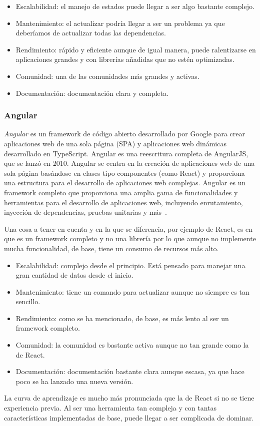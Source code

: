 \begin{itemize}
    \item[\bien] Escalabilidad: el manejo de estados puede llegar a ser algo bastante complejo.
    \item[\regular] Mantenimiento: el actualizar podría llegar a ser un problema ya que deberíamos de actualizar todas las dependencias.
    \item[\regular] Rendimiento: rápido y eficiente aunque de igual manera, puede ralentizarse en aplicaciones grandes y con librerías añadidas que no estén optimizadas.
    \item[\esp] Comunidad: una de las comunidades más grandes y activas.
    \item[\bien] Documentación: documentación clara y completa.
\end{itemize}

\subsubsection{Angular}

\textit{Angular} es un framework de código abierto desarrollado por Google para crear aplicaciones web de una sola página (SPA) y aplicaciones web dinámicas desarrollado en TypeScript. Angular es una reescritura completa de AngularJS, que se lanzó en 2010. Angular se centra en la creación de aplicaciones web de una sola página basándose en clases tipo componentes (como React) y proporciona una estructura para el desarrollo de aplicaciones web complejas. Angular es un framework completo que proporciona una amplia gama de funcionalidades y herramientas para el desarrollo de aplicaciones web, incluyendo enrutamiento, inyección de dependencias, pruebas unitarias y más~\cite{angular-wikipedia}.

Una cosa a tener en cuenta y en la que se diferencia, por ejemplo de React, es en que es un framework completo y no una librería por lo que aunque no implemente mucha funcionalidad, de base, tiene un consumo de recursos más alto.

\begin{itemize}
    \item[\regular] Escalabilidad: complejo desde el principio. Está pensado para manejar una gran cantidad de datos desde el inicio.
    \item[\bien] Mantenimiento: tiene un comando para actualizar aunque no siempre es tan sencillo.
    \item[\regular] Rendimiento: como se ha mencionado, de base, es más lento al ser un framework completo.
    \item[\regular] Comunidad: la comunidad es bastante activa aunque no tan grande como la de React.
    \item[\regular] Documentación: documentación bastante clara aunque escasa, ya que hace poco se ha lanzado una nueva versión.
\end{itemize}

La curva de aprendizaje es mucho más pronunciada que la de React si no se tiene experiencia previa. Al ser una herramienta tan compleja y con tantas características implementadas de base, puede llegar a ser complicada de dominar.